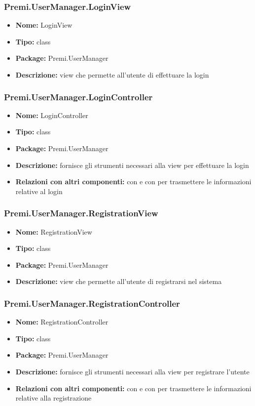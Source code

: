 \subsubsection{Premi.UserManager.LoginView}
\begin{itemize}
  \item \textbf{Nome:} LoginView
  \item \textbf{Tipo:} class
  \item \textbf{Package:} Premi.UserManager
  \item \textbf{Descrizione:} view che permette all'utente di effettuare la login
\end{itemize}
\subsubsection{Premi.UserManager.LoginController}
\begin{itemize}
  \item \textbf{Nome:} LoginController
  \item \textbf{Tipo:} class
  \item \textbf{Package:} Premi.UserManager
  \item \textbf{Descrizione:} fornisce gli strumenti necessari alla view per effettuare la login
  \item \textbf{Relazioni con altri componenti:} con  e con  per trasmettere le informazioni relative al login
\end{itemize}
\subsubsection{Premi.UserManager.RegistrationView}
\begin{itemize}
  \item \textbf{Nome:} RegistrationView
  \item \textbf{Tipo:} class
  \item \textbf{Package:} Premi.UserManager
  \item \textbf{Descrizione:} view che permette all'utente di registrarsi nel sistema
\end{itemize}
\subsubsection{Premi.UserManager.RegistrationController}
\begin{itemize}
  \item \textbf{Nome:} RegistrationController
  \item \textbf{Tipo:} class
  \item \textbf{Package:} Premi.UserManager
  \item \textbf{Descrizione:} fornisce gli strumenti necessari alla view per registrare l'utente
  \item \textbf{Relazioni con altri componenti:} con  e con  per trasmettere le informazioni relative alla registrazione
\end{itemize}
